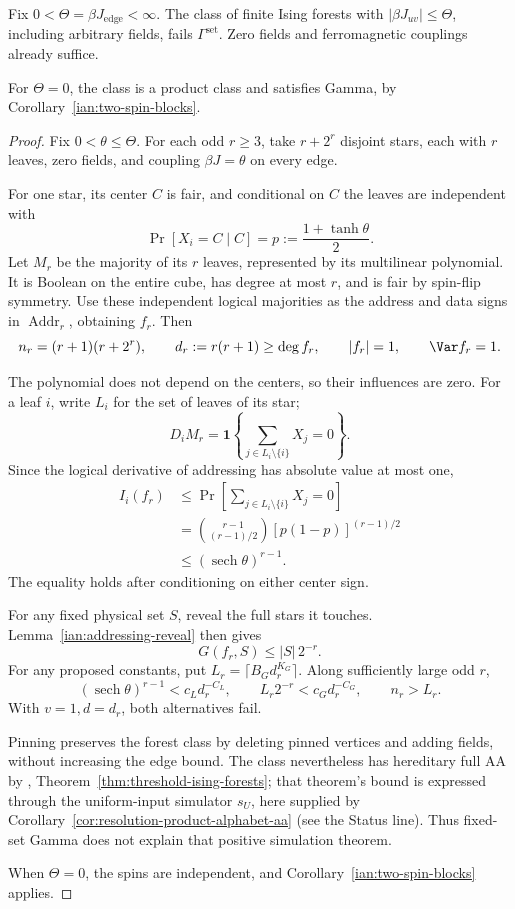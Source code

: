 \begin{proposition}
\label{ian:forest-addressing}
Fix \(0<\Theta=\beta J_{\mathrm{edge}}<\infty\).
The class of finite Ising forests with
\(|\beta J_{uv}|\le\Theta\), including arbitrary fields, fails
\(\Gamma^{\mathrm{set}}\). Zero fields and ferromagnetic couplings
already suffice.

For \(\Theta=0\), the class is a product class and satisfies Gamma,
by Corollary~\ref{ian:two-spin-blocks}.
\end{proposition}

\begin{proof}
Fix \(0<\theta\le\Theta\). For each odd \(r\ge3\), take
\(r+2^r\) disjoint stars, each with \(r\) leaves, zero fields, and
coupling \(\beta J=\theta\) on every edge.

For one star, its center \(C\) is fair, and conditional on \(C\)
the leaves are independent with
\[
 \Pr[X_i=C\mid C]=p:=\frac{1+\tanh\theta}{2}.
\]
Let \(M_r\) be the majority of its \(r\) leaves, represented by its
multilinear polynomial. It is Boolean on the entire cube, has degree
at most \(r\), and is fair by spin-flip symmetry.
Use these independent logical majorities as the address and data
signs in \(\operatorname{Addr}_r\), obtaining \(f_r\). Then
\[
 n_r=(r+1)(r+2^r),\qquad
 d_r:=r(r+1)\ge\deg f_r,\qquad
 |f_r|=1,\qquad \Var f_r=1.
\]

The polynomial does not depend on the centers, so their influences
are zero. For a leaf \(i\), write \(L_i\) for the set of leaves of its star;
\[
 D_iM_r=\mathbf1\left\{\sum_{j\in L_i\setminus\{i\}}X_j=0\right\}.
\]
Since the logical derivative of addressing has absolute value at
most one,
\[
 \begin{split}
 I_i(f_r)
 &\le\Pr\left[\sum_{j\in L_i\setminus\{i\}}X_j=0\right]\\
 &=\binom{r-1}{(r-1)/2}
        [p(1-p)]^{(r-1)/2}\\
 &\le(\operatorname{sech}\theta)^{r-1}.
 \end{split}
\]
The equality holds after conditioning on either center sign.

For any fixed physical set \(S\), reveal the full stars it touches.
Lemma~\ref{ian:addressing-reveal} then gives
\[
 G(f_r,S)\le |S|\,2^{-r}.
\]
For any proposed constants, put
\(L_r=\lceil B_Gd_r^{K_G}\rceil\).
Along sufficiently large odd \(r\),
\[
 (\operatorname{sech}\theta)^{r-1}<c_Ld_r^{-C_L},
 \qquad
 L_r2^{-r}<c_Gd_r^{-C_G},
 \qquad n_r>L_r.
\]
With \(v=1,d=d_r\), both alternatives fail.

Pinning preserves the forest class by deleting pinned vertices and
adding fields, without increasing the edge bound. The class
nevertheless has hereditary full AA by
,
Theorem~\ref{thm:threshold-ising-forests}; that theorem's bound is
expressed through the uniform-input simulator \(s_U\), here supplied by
Corollary~\ref{cor:resolution-product-alphabet-aa} (see the Status
line). Thus fixed-set Gamma does not explain that positive simulation
theorem.

When \(\Theta=0\), the spins are independent, and
Corollary~\ref{ian:two-spin-blocks} applies.
\end{proof}
